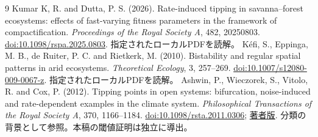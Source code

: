 \documentclass[a4paper,11pt]{ltjsarticle}
\begin{document}
\begin{thebibliography}{9}
Kumar K, R. and Dutta, P. S. (2026).
Rate-induced tipping in savanna--forest ecosystems:
effects of fast-varying fitness parameters in the framework of compactification.
\emph{Proceedings of the Royal Society A}, 482, 20250803.
\href{https://doi.org/10.1098/rspa.2025.0803}{doi:10.1098/rspa.2025.0803}.
指定されたローカルPDFを読解。
Kéfi, S., Eppinga, M. B., de Ruiter, P. C. and Rietkerk, M. (2010).
Bistability and regular spatial patterns in arid ecosystems.
\emph{Theoretical Ecology}, 3, 257--269.
\href{https://doi.org/10.1007/s12080-009-0067-z}{doi:10.1007/s12080-009-0067-z}.
指定されたローカルPDFを読解。
Ashwin, P., Wieczorek, S., Vitolo, R. and Cox, P. (2012).
Tipping points in open systems: bifurcation, noise-induced and rate-dependent
examples in the climate system.
\emph{Philosophical Transactions of the Royal Society A}, 370, 1166--1184.
\href{https://doi.org/10.1098/rsta.2011.0306}{doi:10.1098/rsta.2011.0306};
\href{https://arxiv.org/abs/1103.0169}{著者版}.
分類の背景として参照。本稿の閾値証明は独立に導出。
\end{thebibliography}
\end{document}
